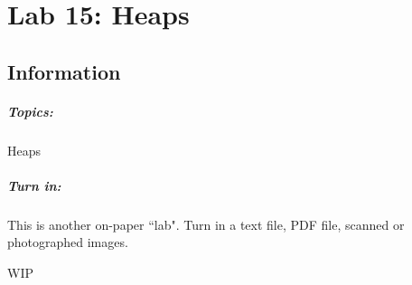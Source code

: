 \documentclass[a4paper,12pt,oneside]{book}
\title{}
\author{Rachel Morris}
\date{\today}
\newcommand{\laLab}{Lab 15: Heaps\ }
\begin{document}
    \chapter*{\laLab} 

        \section{Information}
            \paragraph{ Topics: } Heaps
            \paragraph{ Turn in: } This is another on-paper ``lab". Turn in a text file, PDF file, scanned or photographed images.
            

    \hrulefill

    WIP
\end{document}

